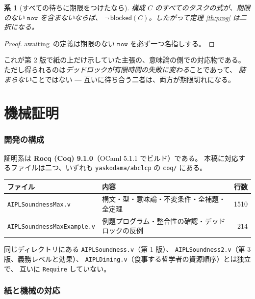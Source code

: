 \documentclass[11pt,a4paper]{ltjsarticle}
\newtheorem{corollary}[theorem]{系}
\theoremstyle{definition}
\theoremstyle{remark}
\newcommand{\blocked}{\textsf{blocked}}
\newcommand{\awaiting}{\textsf{awaiting}}
\begin{document}
\begin{corollary}[すべての待ちに期限をつけたなら]
構成 $C$ のすべてのタスクの式が、期限のない $\mathtt{now}$ を含まないならば、
$\neg\,\blocked(C)$。したがって定理 \ref{th:prog} は二択になる。
\end{corollary}

\begin{proof}
\awaiting\ の定義は期限のない $\mathtt{now}$ を必ず一つ名指しする。
\end{proof}

これが第 2 版で紙の上だけ示していた主張の、意味論の側での対応物である。
ただし得られるのは\emph{デッドロックが有限時間の失敗に変わる}ことであって、
\emph{詰まらない}ことではない --- 互いに待ち合う二者は、両方が期限切れになる。

\part{機械証明}

\section{開発の構成}

証明系は \textbf{Rocq (Coq) 9.1.0}（OCaml 5.1.1 でビルド）である。
本稿に対応するファイルは二つ、いずれも
\texttt{yaskodama/abclcp} の \texttt{coq/} にある。

\begin{center}
\begin{tabular}{llr}
\toprule
ファイル & 内容 & 行数 \\
\midrule
\texttt{AIPLSoundnessMax.v} & 構文・型・意味論・不変条件・全補題・全定理 & 1510 \\
\texttt{AIPLSoundnessMaxExample.v} & 例題プログラム・整合性の確認・デッドロックの反例 & 214 \\
\bottomrule
\end{tabular}
\end{center}

同じディレクトリにある \texttt{AIPLSoundness.v}（第 1 版）、
\texttt{AIPLSoundness2.v}（第 3 版、義務レベルと効果）、
\texttt{AIPLDining.v}（食事する哲学者の資源順序）とは独立で、
互いに \texttt{Require} していない。

\section{紙と機械の対応}
\end{document}
